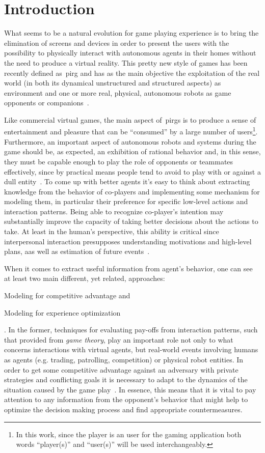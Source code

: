 \chapter{Introduction}
What seems to be a natural evolution for game playing experience is to bring the elimination of screens and devices in order to present the users with the possibility to physically interact with autonomous agents in their homes without the need to produce a virtual reality. This pretty new style of games has been recently defined as~\gls{pirg} and has as the main objective the exploitation of the real world (in both its dynamical unstructured and structured aspects) as environment and one or more real, physical, autonomous robots as game opponents or companions~\cite{martinoia_physically_2013}.

Like commercial virtual games, the main aspect of~\gls{pirg}s is to produce a sense of entertainment and pleasure that can be ``consumed'' by a large number of users\footnote{In this work, since the player is an user for the gaming application both words ``player(s)'' and ``user(s)'' will be used interchangeably.}. Furthermore, an important aspect of autonomous robots and systems during the game should be, as expected, an exhibition of rational behavior and, in this sense, they must be capable enough to play the role of opponents or teammates effectively, since by practical means people tend to avoid to play with or against a dull entity~\cite{martinoia_physically_2013}.
To come up with better agents it's easy to think about extracting knowledge from the behavior of co-players and implementing some mechanism for modeling them, in particular their preference for specific low-level actions and interaction patterns. Being able to recognize co-player's intention may substantially improve the capacity of taking better decisions about the actions to take.  At least in the human's perspective, this ability is critical since interpersonal interaction presupposes understanding  motivations and high-level plans, aas well as estimation of future events~\cite{sukthankar_plan_2014}.

When it comes to extract useful information from agent's behavior, one can see at least two main different, yet related, approaches: \begin{inparaenum}\item Modeling for competitive advantage and \item Modeling for experience optimization\end{inparaenum}. In the former, techniques for evaluating pay-offs from interaction patterns, such that provided from \textit{game theory}, play an important role not only to what concerns interactions with virtual agents, but real-world events involving humans as agents (e.g. trading, patrolling, competition) or physical robot entities. In order to get some competitive advantage against an adversary with private strategies and conflicting goals it is necessary to adapt to the dynamics of the situation caused by the game play~\cite{rofer_overview_2012}. In essence, this means that it is vital to pay attention to any information from the opponent's behavior that might help to optimize the decision making process and find appropriate countermeasures.


